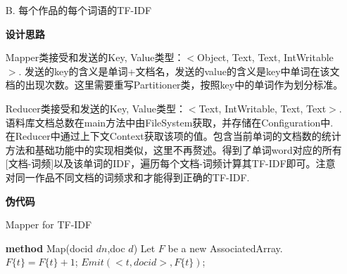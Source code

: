 \documentclass[a4paper,UTF8]{article}
\theoremstyle{definition}
\begin{document}
\begin{CJK}{UTF8}{gkai}
\begin{enumerate}
\begin{algorithm}[htb]
\begin{algorithmic}[1]
\end{algorithmic}
\end{algorithm}
	\item[B.] 每个作品的每个词语的TF-IDF
	\par 
	\par \textbf{设计思路}
	\par Mapper类接受和发送的Key, Value类型：$<$Object, Text, Text, IntWritable$>$. 发送的key的含义是单词+文档名，发送的value的含义是key中单词在该文档的出现次数。这里需要重写Partitioner类，按照key中的单词作为划分标准。
	\par Reducer类接受和发送的Key, Value类型：$<$Text, IntWritable, Text, Text$>$. 语料库文档总数在main方法中由FileSystem获取，并存储在Configuration中. 在Reducer中通过上下文Context获取该项的值。包含当前单词的文档数的统计方法和基础功能中的实现相类似，这里不再赘述。得到了单词word对应的所有[文档-词频]以及该单词的IDF，遍历每个文档-词频计算其TF-IDF即可。注意对同一作品不同文档的词频求和才能得到正确的TF-IDF.
	\par \textbf{伪代码}

\begin{algorithm}[htb]
\caption{Mapper for TF-IDF}
\label{alg:Framwork}
\begin{algorithmic}[1] %
	 \STATE \textbf{method} Map(docid $dn$,doc $d$)
    \STATE Let $F$ be a new AssociatedArray.
	 	\STATE $F\{t\} = F\{t\} + 1$;
	 \ENDFOR
	 	\STATE $Emit(<t, docid>, F\{t\})$;
	 \ENDFOR
	 \RETURN
\end{algorithmic}
\end{algorithm}


\end{enumerate}
\end{CJK}
\end{document}
